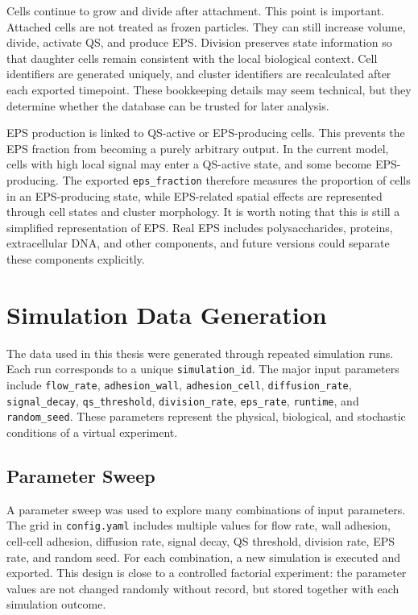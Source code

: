 \documentclass[12pt,a4paper,oneside]{report}
\begin{document}
Cells continue to grow and divide after attachment. This point is important. Attached cells are not treated as frozen particles. They can still increase volume, divide, activate QS, and produce EPS. Division preserves state information so that daughter cells remain consistent with the local biological context. Cell identifiers are generated uniquely, and cluster identifiers are recalculated after each exported timepoint. These bookkeeping details may seem technical, but they determine whether the database can be trusted for later analysis.

EPS production is linked to QS-active or EPS-producing cells. This prevents the EPS fraction from becoming a purely arbitrary output. In the current model, cells with high local signal may enter a QS-active state, and some become EPS-producing. The exported \texttt{eps\_fraction} therefore measures the proportion of cells in an EPS-producing state, while EPS-related spatial effects are represented through cell states and cluster morphology. It is worth noting that this is still a simplified representation of EPS. Real EPS includes polysaccharides, proteins, extracellular DNA, and other components, and future versions could separate these components explicitly.

\section{Simulation Data Generation}
The data used in this thesis were generated through repeated simulation runs. Each run corresponds to a unique \texttt{simulation\_id}. The major input parameters include \texttt{flow\_rate}, \texttt{adhesion\_wall}, \texttt{adhesion\_cell}, \texttt{diffusion\_rate}, \texttt{signal\_decay}, \texttt{qs\_threshold}, \texttt{division\_rate}, \texttt{eps\_rate}, \texttt{runtime}, and \texttt{random\_seed}. These parameters represent the physical, biological, and stochastic conditions of a virtual experiment.

\subsection{Parameter Sweep}
A parameter sweep was used to explore many combinations of input parameters. The grid in \texttt{config.yaml} includes multiple values for flow rate, wall adhesion, cell-cell adhesion, diffusion rate, signal decay, QS threshold, division rate, EPS rate, and random seed. For each combination, a new simulation is executed and exported. This design is close to a controlled factorial experiment: the parameter values are not changed randomly without record, but stored together with each simulation outcome.
\end{document}
